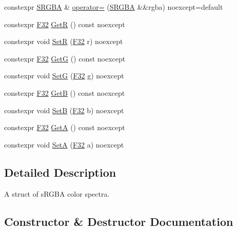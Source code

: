 \begin{DoxyCompactItemize}
\item 
constexpr \mbox{\hyperlink{structmage_1_1_s_r_g_b_a}{S\+R\+G\+BA}} \& \mbox{\hyperlink{structmage_1_1_s_r_g_b_a_abf4cd2acd424cbad774a5170087f7b01}{operator=}} (\mbox{\hyperlink{structmage_1_1_s_r_g_b_a}{S\+R\+G\+BA}} \&\&rgba) noexcept=default
\item 
constexpr \mbox{\hyperlink{namespacemage_aa97e833b45f06d60a0a9c4fc22ae02c0}{F32}} \mbox{\hyperlink{structmage_1_1_s_r_g_b_a_a7f88a4619ba00d7a8d8b33e5f07b3b81}{GetR}} () const noexcept
\item 
constexpr void \mbox{\hyperlink{structmage_1_1_s_r_g_b_a_a5716004c31803848e5a0b50fee5bee55}{SetR}} (\mbox{\hyperlink{namespacemage_aa97e833b45f06d60a0a9c4fc22ae02c0}{F32}} r) noexcept
\item 
constexpr \mbox{\hyperlink{namespacemage_aa97e833b45f06d60a0a9c4fc22ae02c0}{F32}} \mbox{\hyperlink{structmage_1_1_s_r_g_b_a_a5603f67bb32b82a28758dbf26eddc8fd}{GetG}} () const noexcept
\item 
constexpr void \mbox{\hyperlink{structmage_1_1_s_r_g_b_a_a654633df97da325ed0b838e80c6c243e}{SetG}} (\mbox{\hyperlink{namespacemage_aa97e833b45f06d60a0a9c4fc22ae02c0}{F32}} g) noexcept
\item 
constexpr \mbox{\hyperlink{namespacemage_aa97e833b45f06d60a0a9c4fc22ae02c0}{F32}} \mbox{\hyperlink{structmage_1_1_s_r_g_b_a_a5797da9eb025eab2d7e8b3331a8fd312}{GetB}} () const noexcept
\item 
constexpr void \mbox{\hyperlink{structmage_1_1_s_r_g_b_a_ae3cd3242e9b75444d8e6ae6bd9098b58}{SetB}} (\mbox{\hyperlink{namespacemage_aa97e833b45f06d60a0a9c4fc22ae02c0}{F32}} b) noexcept
\item 
constexpr \mbox{\hyperlink{namespacemage_aa97e833b45f06d60a0a9c4fc22ae02c0}{F32}} \mbox{\hyperlink{structmage_1_1_s_r_g_b_a_a90ab59ec00e8e710a1d679cb0277373f}{GetA}} () const noexcept
\item 
constexpr void \mbox{\hyperlink{structmage_1_1_s_r_g_b_a_a42ec1125cb5f2ccc4520b6f0c195ae59}{SetA}} (\mbox{\hyperlink{namespacemage_aa97e833b45f06d60a0a9c4fc22ae02c0}{F32}} a) noexcept
\end{DoxyCompactItemize}


\subsection{Detailed Description}
A struct of s\+R\+G\+BA color spectra. 

\subsection{Constructor \& Destructor Documentation}
\mbox{\label{structmage_1_1_s_r_g_b_a_ab2d736d077534d550020b0f01e5780ae}} 
